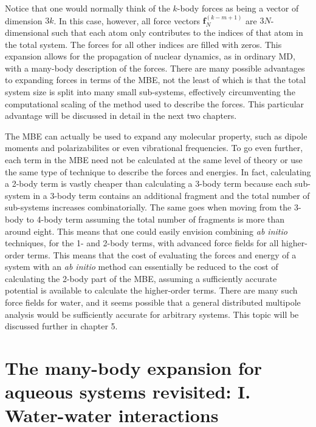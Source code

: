 \documentclass[11pt, proquest]{uwthesis}[2020/02/24]
\begin{document}
Notice that one would normally think of the $k$-body forces as being a vector of dimension $3k$. In this case, however, all force vectors $\mathbf{f}_N^{(k-m+1)}$ are $3N$-dimensional such that each atom only contributes to the indices of that atom in the total system. The forces for all other indices are filled with zeros. This expansion allows for the propagation of nuclear dynamics, as in ordinary MD, with a many-body description of the forces. There are many possible advantages to expanding forces in terms of the MBE, not the least of which is that the total system size is split into many small sub-systems, effectively circumventing the computational scaling of the method used to describe the forces. This particular advantage will be discussed in detail in the next two chapters.

\par The MBE can actually be used to expand any molecular property, such as dipole moments and polarizabilites\autocite{medders_many-body_2013} or even vibrational frequencies\autocite{howard_n-body_2013,heindel_origin_2018}. To go even further, each term in the MBE need not be calculated at the same level of theory or use the same type of technique to describe the forces and energies. In fact, calculating a 2-body term is vastly cheaper than calculating a 3-body term because each sub-system in a 3-body term contains an additional fragment and the total number of sub-systems increases combinatorially. The same goes when moving from the 3-body to 4-body term assuming the total number of fragments is more than around eight. This means that one could easily envision combining \textit{ab initio} techniques, for the 1- and 2-body terms, with advanced force fields for all higher-order terms. This means that the cost of evaluating the forces and energy of a system with an \textit{ab initio} method can essentially be reduced to the cost of calculating the 2-body part of the MBE, assuming a sufficiently accurate potential is available to calculate the higher-order terms. There are many such force fields for water, and it seems possible that a general distributed multipole analysis would be sufficiently accurate for arbitrary systems. This topic will be discussed further in chapter 5.

\chapter{The many-body expansion for aqueous systems revisited: I. Water-water interactions}
\end{document}
